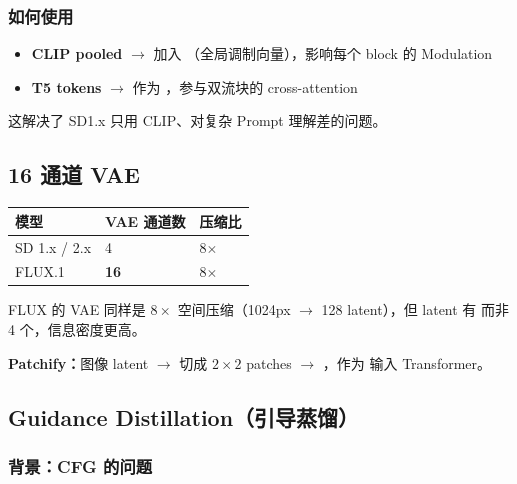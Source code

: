 \subsubsection{如何使用}

\begin{itemize}[leftmargin=1.5em]
  \item \textbf{CLIP pooled} $\to$ 加入 （全局调制向量），影响每个 block 的 Modulation
  \item \textbf{T5 tokens} $\to$ 作为 ，参与双流块的 cross-attention
\end{itemize}

这解决了 SD1.x 只用 CLIP、对复杂 Prompt 理解差的问题。

\subsection{16 通道 VAE}

\begin{summarybox}
\begin{center}
{\small
\begin{tabular}{p{3.5cm}p{3cm}p{2.5cm}}
\hline
\textbf{模型} & \textbf{VAE 通道数} & \textbf{压缩比} \\
\hline
SD 1.x / 2.x & 4 & 8$\times$ \\
FLUX.1 & \textbf{16} & 8$\times$ \\
\hline
\end{tabular}
}
\end{center}
\end{summarybox}

FLUX 的 VAE 同样是 $8\times$ 空间压缩（1024px $\to$ 128 latent），但 latent 有 而非 4 个，信息密度更高。

\textbf{Patchify：}图像 latent \code{[B, 16, H, W]} $\to$ 切成 $2\times2$ patches $\to$ \code{[B, N, 16*4=64]}，作为  输入 Transformer。

\subsection{Guidance Distillation（引导蒸馏）}

\subsubsection{背景：CFG 的问题}

